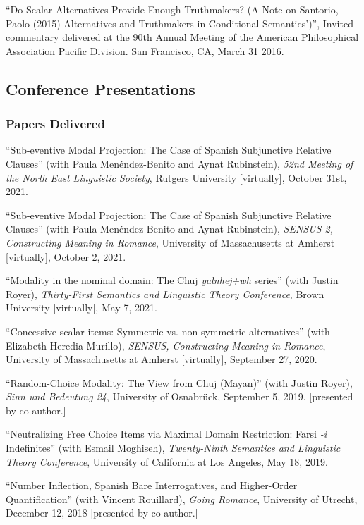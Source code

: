 \documentclass[11pt]{article}
\begin{document}
``Do Scalar Alternatives Provide Enough Truthmakers? (A Note on Santorio, Paolo (2015) Alternatives and Truthmakers in Conditional Semantics')'', Invited commentary delivered at the 90th Annual Meeting of the American Philosophical Association Pacific Division. San Francisco, CA, March 31 2016. 


\subsection*{Conference Presentations}


\subsubsection*{Papers Delivered}

``Sub-eventive Modal Projection:
The Case of Spanish Subjunctive Relative Clauses'' (with Paula Men\'endez-Benito and Aynat Rubinstein), \textit{52nd
  Meeting of the North East Linguistic Society}, Rutgers University [virtually], October 31st, 2021.


``Sub-eventive Modal Projection:
The Case of Spanish Subjunctive Relative Clauses'' (with Paula Men\'endez-Benito and Aynat Rubinstein), \textit{SENSUS 2, Constructing Meaning in Romance}, University of Massachusetts at Amherst [virtually], October 2, 2021.

``Modality in the nominal domain: The Chuj \textit{yalnhej+wh} series'' (with Justin Royer), \textit{Thirty-First Semantics and Linguistic Theory Conference}, Brown University [virtually], May 7, 2021.

``Concessive scalar items: Symmetric vs. non-symmetric alternatives'' (with Elizabeth Heredia-Murillo), \textit{SENSUS, Constructing Meaning in Romance}, University of Massachusetts at Amherst [virtually], September 27, 2020.

``Random-Choice Modality: The View from Chuj (Mayan)'' (with Justin Royer), \textit{Sinn und Bedeutung 24}, University of Osnabr\"{u}ck, September 5, 2019. [presented by co-author.]

``Neutralizing Free Choice Items via Maximal Domain Restriction: Farsi \textit{-i} Indefinites'' (with Esmail Moghiseh), \textit{Twenty-Ninth Semantics and Linguistic Theory Conference}, University of California at Los Angeles, May 18, 2019.

``Number Inflection, Spanish Bare Interrogatives, and Higher-Order Quantification'' (with Vincent Rouillard), \textit{Going Romance}, University of Utrecht, December 12, 2018 [presented by co-author.]
\end{document}
